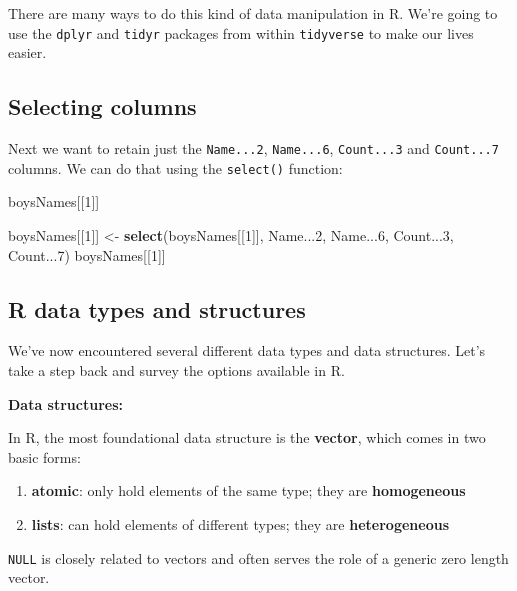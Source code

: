\documentclass[]{book}
\newenvironment{Shaded}{\begin{snugshade}}{\end{snugshade}}
\newcommand{\DecValTok}[1]{\textcolor[rgb]{0.00,0.00,0.81}{#1}}
\newcommand{\KeywordTok}[1]{\textcolor[rgb]{0.13,0.29,0.53}{\textbf{#1}}}
\newcommand{\NormalTok}[1]{#1}
\newcommand{\StringTok}[1]{\textcolor[rgb]{0.31,0.60,0.02}{#1}}
\providecommand{\tightlist}{%
  \setlength{\itemsep}{0pt}\setlength{\parskip}{0pt}}
\begin{document}
There are many ways to do this kind of data manipulation in R. We're
going to use the \texttt{dplyr} and \texttt{tidyr} packages from within \texttt{tidyverse}
to make our lives easier.

\hypertarget{selecting-columns}{%
\subsection{Selecting columns}\label{selecting-columns}}

Next we want to retain just the \texttt{Name...2}, \texttt{Name...6}, \texttt{Count...3} and \texttt{Count...7} columns.
We can do that using the \texttt{select()} function:

\begin{Shaded}
\begin{Highlighting}[]
\NormalTok{boysNames[[}\DecValTok{1}\NormalTok{]]}

\NormalTok{boysNames[[}\DecValTok{1}\NormalTok{]] <-}\StringTok{ }\KeywordTok{select}\NormalTok{(boysNames[[}\DecValTok{1}\NormalTok{]], Name...}\DecValTok{2}\NormalTok{, Name...}\DecValTok{6}\NormalTok{, Count...}\DecValTok{3}\NormalTok{, Count...}\DecValTok{7}\NormalTok{)}
\NormalTok{boysNames[[}\DecValTok{1}\NormalTok{]]}
\end{Highlighting}
\end{Shaded}

\hypertarget{r-data-types-and-structures}{%
\subsection{R data types and structures}\label{r-data-types-and-structures}}

We've now encountered several different data types and data structures. Let's take a step back and survey the options available in R.

\textbf{Data structures:}

In R, the most foundational data structure is the \textbf{vector}, which comes in two basic forms:

\begin{enumerate}
\def\labelenumi{\arabic{enumi}.}
\tightlist
\item
  \textbf{atomic}: only hold elements of the same type; they are \textbf{homogeneous}
\item
  \textbf{lists}: can hold elements of different types; they are \textbf{heterogeneous}
\end{enumerate}

\texttt{NULL} is closely related to vectors and often serves the role of a generic zero length vector.
\end{document}
